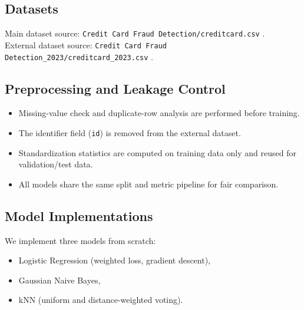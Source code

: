 \documentclass[conference]{IEEEtran}
\begin{document}
\subsection{Datasets}
\begin{table}[H]
\centering
\caption{Dataset summary}
\label{tab:dataset_summary}
\end{table}

Main dataset source: \texttt{Credit Card Fraud Detection/creditcard.csv} \cite{project_dataset_main}.\\
External dataset source: \texttt{Credit Card Fraud Detection\_2023/creditcard\_2023.csv} \cite{project_dataset_2023}.

\subsection{Preprocessing and Leakage Control}
\begin{itemize}
  \item Missing-value check and duplicate-row analysis are performed before training.
  \item The identifier field (\texttt{id}) is removed from the external dataset.
  \item Standardization statistics are computed on training data only and reused for validation/test data.
  \item All models share the same split and metric pipeline for fair comparison.
\end{itemize}

\subsection{Model Implementations}
We implement three models from scratch:
\begin{itemize}
  \item Logistic Regression (weighted loss, gradient descent),
  \item Gaussian Naive Bayes,
  \item kNN (uniform and distance-weighted voting).
\end{itemize}
\end{document}

